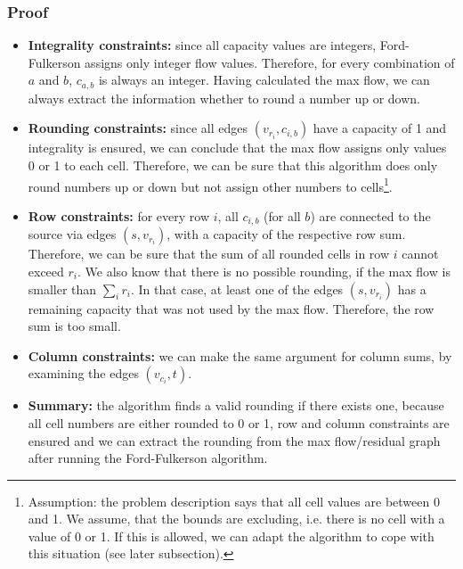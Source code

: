\documentclass[12pt]{article}
\begin{document}
\subsubsection*{Proof}
\begin{itemize}
	\item \textbf{Integrality constraints:} since all capacity values are integers, Ford-Fulkerson assigns only integer flow values. Therefore, for every combination of $a$ and $b$, $c_{a,b}$ is always an integer. Having calculated the max flow, we can always extract the information whether to round a number up or down.
	\item \textbf{Rounding constraints:} since all edges $(v_{r_i}, c_{i,b})$ have a capacity of 1 and integrality is ensured, we can conclude that the max flow assigns only values 0 or 1 to each cell. Therefore, we can be sure that this algorithm does only round numbers up or down but not assign other numbers to cells\footnote{Assumption: the problem description says that all cell values are between 0 and 1. We assume, that the bounds are excluding, i.e. there is no cell with a value of 0 or 1. If this is allowed, we can adapt the algorithm to cope with this situation (see later subsection).}.
	\item \textbf{Row constraints:} for every row $i$, all $c_{i, b}$ (for all $b$) are connected to the source via edges $(s, v_{r_i})$, with a capacity of the respective row sum. Therefore, we can be sure that the sum of all rounded cells in row $i$ cannot exceed $r_i$. We also know that there is no possible rounding, if the max flow is smaller than $\sum_{i} r_i$. In that case, at least one of the edges $(s, v_{r_i})$ has a remaining capacity that was not used by the max flow. Therefore, the row sum is too small.
	\item \textbf{Column constraints:} we can make the same argument for column sums, by examining the edges $(v_{c_i}, t)$.
	\item \textbf{Summary:} the algorithm finds a valid rounding if there exists one, because all cell numbers are either rounded to 0 or 1, row and column constraints are ensured and we can extract the rounding from the max flow/residual graph after running the Ford-Fulkerson algorithm.
\end{itemize}
\end{document}
